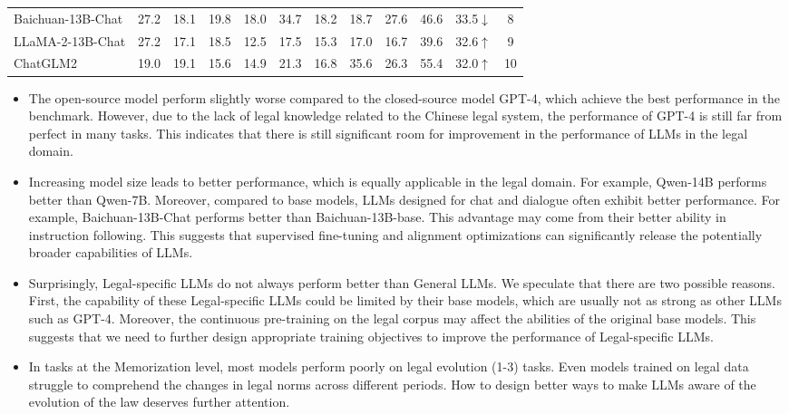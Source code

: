 \begin{table*}[t]
\begin{tabular}{l|cc|cccc|ccc|c|c}
Baichuan-13B-Chat & 27.2          & 18.1          & 19.8          & 18.0          & 34.7          & 18.2          & 18.7          & 27.6          & 46.6          & 33.5$\downarrow$          & 8          \\
LLaMA-2-13B-Chat  & 27.2          & 17.1          & 18.5          & 12.5          & 17.5          & 15.3          & 17.0          & 16.7          & 39.6          & 32.6$\uparrow$          & 9          \\
ChatGLM2          & 19.0          & 19.1          & 15.6          & 14.9          & 21.3          & 16.8          & 35.6          & 26.3          & 55.4          & 32.0$\uparrow$          & 10   \\
 \hline
\end{tabular}
\vspace{-3mm}

\label{few-2}
\end{table*}

\begin{itemize}[leftmargin=*]
    \item The open-source model perform slightly worse compared to the closed-source model GPT-4, which achieve the best performance in the benchmark. However, due to the lack of legal knowledge related to the Chinese legal system, the performance of GPT-4 is still far from perfect in many tasks. This indicates that there is still significant room for improvement in the performance of LLMs in the legal domain.
    \item Increasing model size leads to better performance, which is equally applicable in the legal domain. For example, Qwen-14B performs better than Qwen-7B. Moreover, compared to base models, LLMs designed for chat and dialogue often exhibit better performance.  For example, Baichuan-13B-Chat performs better than Baichuan-13B-base. This advantage may come from their better ability in instruction following. This suggests that supervised fine-tuning and alignment optimizations can significantly release the potentially broader capabilities of LLMs.
    \item Surprisingly, Legal-specific LLMs do not always perform better than General LLMs. We speculate that there are two possible reasons. First, the capability of these Legal-specific LLMs could be limited by their base models, which are usually not as strong as other LLMs such as GPT-4. Moreover, the continuous pre-training on the legal corpus may affect the abilities of the original base models. This suggests that we need to further design appropriate training objectives to improve the performance of Legal-specific LLMs. 
    \item In tasks at the Memorization level, most models perform poorly on legal evolution (1-3) tasks. Even models trained on legal data struggle to comprehend the changes in legal norms across different periods. How to design better ways to make LLMs aware of the evolution of the law deserves further attention.
\end{itemize}

